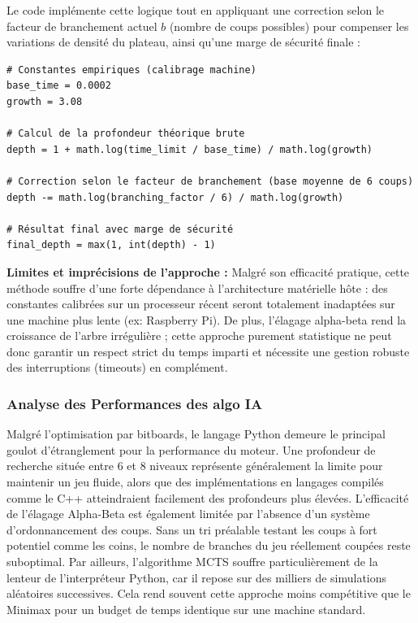 \documentclass[a4paper]{article}
\begin{document}
Le code implémente cette logique tout en appliquant une correction selon le facteur de branchement actuel $b$ (nombre de coups possibles) pour compenser les variations de densité du plateau, ainsi qu'une marge de sécurité finale :

\begin{verbatim}
# Constantes empiriques (calibrage machine)
base_time = 0.0002
growth = 3.08

# Calcul de la profondeur théorique brute
depth = 1 + math.log(time_limit / base_time) / math.log(growth)

# Correction selon le facteur de branchement (base moyenne de 6 coups)
depth -= math.log(branching_factor / 6) / math.log(growth)

# Résultat final avec marge de sécurité
final_depth = max(1, int(depth) - 1)
\end{verbatim}

\textbf{Limites et imprécisions de l'approche :}
Malgré son efficacité pratique, cette méthode souffre d'une forte dépendance à l'architecture matérielle hôte : 
des constantes calibrées sur un processeur récent seront totalement inadaptées sur une machine plus lente (ex: Raspberry Pi). 
De plus, l'élagage alpha-beta rend la croissance de l'arbre irrégulière ; cette approche purement statistique ne peut donc garantir un respect strict du temps 
imparti et nécessite une gestion robuste des interruptions (timeouts) en complément.
\subsubsection{Analyse des Performances des algo IA}
Malgré l'optimisation par bitboards, le langage Python demeure le principal goulot d'étranglement pour la performance du moteur. 
Une profondeur de recherche située entre 6 et 8 niveaux représente généralement la limite pour maintenir un jeu fluide, alors que des implémentations en langages compilés comme le C++ atteindraient facilement des profondeurs plus élevées. L'efficacité de l'élagage Alpha-Beta est également limitée par l'absence d'un système d'ordonnancement des coups. Sans un tri préalable testant les coups à fort potentiel comme les coins, le nombre de branches du jeu réellement coupées reste suboptimal. Par ailleurs, l'algorithme MCTS souffre particulièrement de la lenteur de l'interpréteur Python, car il repose sur des milliers de simulations aléatoires successives. Cela rend souvent cette approche moins compétitive que le Minimax pour un budget de temps identique sur une machine standard.
\end{document}
